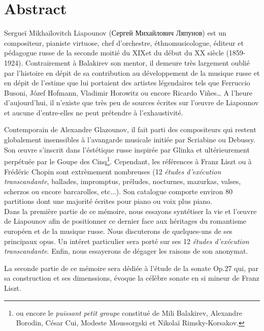 
\chapter*{Abstract}

Sergueï Mikhaïlovitch Liapounov (\foreignlanguage{russian}{Сергей Михайлович
Ляпунов}) est un compositeur, pianiste virtuose, chef d'orchestre, éthnomusicologue,
éditeur et pédagogue russe de la seconde moitié du XIX\ieme et du début du XX\ieme
siècle (1859-1924). Contrairement à Balakirev son mentor, il demeure très largement
oublié par l'histoire en dépit de sa contribution au développement de la musique
russe et en dépit de l'estime que lui portaient des artistes légendaires tels que
Ferruccio Busoni, Józef Hofmann, Vladimir Horowitz ou encore Ricardo Vi\~{n}es\dots{}
A l'heure d'aujourd'hui, il n'existe que très peu de sources écrites sur l'œuvre de
Liapounov et aucune d'entre-elles ne peut prétendre à l'exhaustivité.

Contemporain de Alexandre Glazounov, il fait parti des compositeurs qui restent
globalement insenssibles à l'avangarde musicale initiée par Scriabine ou Debussy.
Son œuvre s'inscrit dans l'éstétique russe inspirée par Glinka et ultérieurement
perpétuée par le Goupe des Cinq\footnote{ou encore le \emph{puissant petit groupe}
constitué de Mili Balakirev, Alexandre Borodin, César Cui, Modeste Moussorgski
et Nikolaï Rimsky-Korsakov.}. Cependant, les références à Franz Liszt ou à Frédéric
Chopin sont extrèmement nombreuses (12 \emph{études d'exécution transcandante},
ballades, impromptus, préludes, nocturnes, mazurkas, valses, scherzos ou encore
barcarolles, etc...). Son catalogue comporte environ 80 partitions dont une
majorité écrites pour piano ou voix plus piano.\\

Dans la première partie de ce mémoire, nous essayons syntétiser la vie et
l'œuvre de Liapounov afin de positionner ce dernier face aux héritages du
romantisme européen et de la musique russe. Nous discuterons de quelques-uns
de ses principaux opus. Un intéret particulier sera porté sur ses 12
\emph{études d'exécution transcandante}. Enfin, nous essayerons de dégager les
raisons de son anonymat.

La seconde partie de ce mémoire sera dédiée à l'étude de la sonate Op.27 qui,
par sa construction et ses dimenssions, évoque la célèbre sonate en si mineur
de Franz Liszt.

